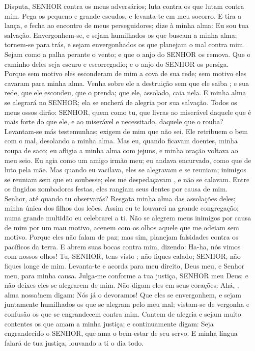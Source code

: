 {\PP 
  Disputa, SENHOR contra os meus adversários; luta contra os que lutam contra mim.
  Pega os
{} pequeno e grande escudos, e levanta-te em meu socorro.
  E tira a lança, e fecha
{} ao encontro de meus perseguidores; dize à minha alma: Eu sou tua salvação.
  Envergonhem-se, e sejam humilhados os que buscam
{} a minha alma; tornem-se para trás, e sejam envergonhados os que planejam o mal contra mim.
  Sejam como a palha perante o vento; e que o anjo do SENHOR os remova.
  Que o caminho deles seja escuro e escorregadio; e o anjo do SENHOR os persiga.
  Porque sem motivo eles esconderam de mim a cova de sua rede; sem motivo eles cavaram para minha alma.
  Venha sobre ele a destruição sem que ele saiba
{} ; e sua rede, que ele escondeu, que o prenda; que ele, assolado, caia nela.
  E minha alma se alegrará no SENHOR; ela se encherá de alegria por sua salvação.
  Todos os meus ossos dirão: SENHOR, quem
{} como tu, que livras ao miserável daquele que é mais forte do que ele, e ao miserável e necessitado, daquele que o rouba?
  Levantam-se más testemunhas; exigem de mim
{} que não sei.
  Ele retribuem o bem com o mal, desolando a minha alma.
  Mas eu, quando ficavam doentes, minha roupa
{} de saco; eu afligia a minha alma com jejuns, e minha oração voltava ao meu seio.
  Eu agia
{} como
{} um amigo
{} irmão meu; eu andava encurvado, como que de luto pela mãe.
  Mas quando eu vacilava, eles se alegravam e se reuniam; inimigos se reuniam sem que eu soubesse; eles me despedaçavam
{}, e não se calavam.
  Entre os fingidos zombadores
{} festas, eles rangiam seus dentes por causa de mim.
  Senhor, até quando tu
{} observarás? Resgata minha alma das assolações deles; minha única
{} dos filhos dos leões.
  Assim eu te louvarei na grande congregação; numa grande multidão eu celebrarei a ti.
  Não se alegrem meus inimigos por causa de mim por um mau motivo,
{} acenem com os olhos aquele que me odeiam sem motivo.
  Porque eles não falam de paz; mas sim, planejam falsidades contra os pacíficos da terra.
  E abrem suas bocas contra mim, dizendo: Ha-ha, nós vimos com nossos
{} olhos!
  Tu, SENHOR, tens visto
{} ; não fiques calado; SENHOR, não fiques longe de mim.
  Levanta-te e acorda para meu direito, Deus meu, e Senhor meu, para minha causa.
  Julga-me conforme a tua justiça, SENHOR meu Deus; e não deixes eles se alegrarem de mim.
  Não digam eles em seus corações: Ahá,
{},  alma nossa!nem digam: Nós já o devoramos!
  Que eles se envergonhem, e sejam juntamente humilhados os que se alegram pelo meu mal; vistam-se de vergonha e confusão os que se engrandecem contra mim.
  Cantem de alegria e sejam muito contentes os que amam a minha justiça; e continuamente digam: Seja engrandecido o SENHOR, que ama o bem-estar de seu servo.
  E minha língua falará de tua justiça, louvando a ti o dia todo.
\par }

